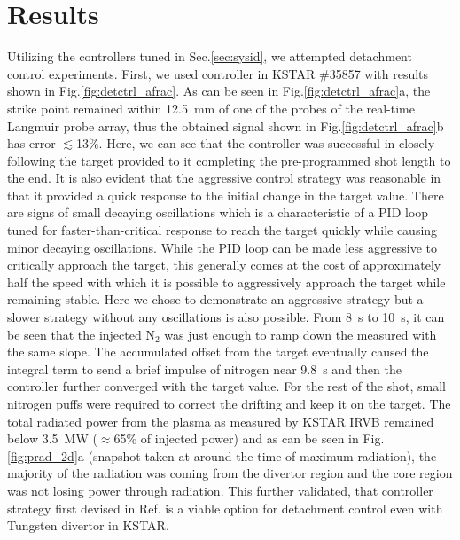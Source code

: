 \section{Results}
\label{sec:results}





Utilizing the controllers tuned in Sec.\ref{sec:sysid}, we attempted detachment control experiments.
First, we used \Afrac{} controller in KSTAR \#35857 with results shown in Fig.\ref{fig:detctrl_afrac}.
As can be seen in Fig.\ref{fig:detctrl_afrac}a, the strike point remained within 12.5~mm of one of the probes of the real-time Langmuir probe array, thus the obtained \Afrac{} signal shown in Fig.\ref{fig:detctrl_afrac}b has error $\lesssim$13\%.
Here, we can see that the controller was successful in closely following the target provided to it completing the pre-programmed shot length to the end.
It is also evident that the aggressive control strategy was reasonable in that it provided a quick response to the initial change in the target value.
There are signs of small decaying oscillations which is a characteristic of a PID loop tuned for faster-than-critical response to reach the target quickly while causing minor decaying oscillations.
While the PID loop can be made less aggressive to critically approach the target, this generally comes at the cost of approximately half the speed with which it is possible to aggressively approach the target while remaining stable.
Here we chose to demonstrate an aggressive strategy but a slower strategy without any oscillations is also possible.
From 8~s to 10~s, it can be seen that the injected N$_2$ was just enough to ramp down the measured \Afrac{} with the same slope.
The accumulated offset from the target eventually caused the integral term to send a brief impulse of nitrogen near 9.8~s and then the controller further converged with the target value.
For the rest of the shot, small nitrogen puffs were required to correct the drifting \Afrac{} and keep it on the target.
The total radiated power from the plasma as measured by KSTAR \ac{IRVB} remained below 3.5~MW ($\approx$65\% of injected power) and as can be seen in Fig.\ref{fig:prad_2d}a (snapshot taken at around the time of maximum radiation), the majority of the radiation was coming from the divertor region and the core region was not losing power through radiation.
This further validated, that \Afrac{} controller strategy first devised in Ref.\cite{Eldon_2022_PPCF} is a viable option for detachment control even with Tungsten divertor in KSTAR.

